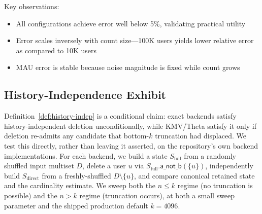 \documentclass[sigconf,anonymous,review]{acmart}
\begin{document}
Key observations:
\begin{itemize}
    \item All configurations achieve error well below 5\%, validating practical utility
    \item Error scales inversely with count size---100K users yields lower relative error as compared to 10K users
    \item MAU error is stable because noise magnitude is fixed while count grows
\end{itemize}

\subsection{History-Independence Exhibit}
\label{sec:history-indep-exhibit}

Definition~\ref{def:history-indep} is a conditional claim: exact backends satisfy history-independent deletion unconditionally, while KMV/Theta satisfy it only if deletion re-admits any candidate that bottom-$k$ truncation had displaced. We test this directly, rather than leaving it asserted, on the repository's own backend implementations. For each backend, we build a state $S_{\text{full}}$ from a randomly shuffled input multiset $D$, delete a user $u$ via $S_{\text{full}}.\textsf{a\_not\_b}(\{u\})$, independently build $S_{\text{direct}}$ from a freshly-shuffled $D \setminus \{u\}$, and compare canonical retained state and the cardinality estimate. We sweep both the $n \le k$ regime (no truncation is possible) and the $n > k$ regime (truncation occurs), at both a small sweep parameter and the shipped production default $k=4096$.
\end{document}
